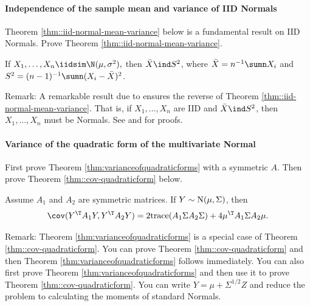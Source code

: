 \paragraph{Independence of the sample mean and variance of IID Normals}\label{hw00math2::independence-mean-variance}


Theorem \ref{thm::iid-normal-mean-variance} below is a fundamental result on IID Normals. Prove Theorem \ref{thm::iid-normal-mean-variance}. 

\begin{theorem}
\label{thm::iid-normal-mean-variance}
If $X_{1},\ldots,X_{n} \iidsim \N(\mu,\sigma^{2}),$ then $\bar{X}\ind S^{2}$,
where $\bar{X}=n^{-1}\sumn X_{i}$ and $S^{2}=(n-1)^{-1}\sumn(X_{i}-\bar{X})^{2}$.
\end{theorem}



Remark: A remarkable result due to \citet{geary1936distribution} ensures the reverse of Theorem \ref{thm::iid-normal-mean-variance}. That is, if $X_{1},\ldots,X_{n} $ are IID and $\bar{X}\ind S^{2}$, then $X_{1},\ldots,X_{n} $ must be Normals. See \citet{lukacs1942characterization} and \citet{benhamou2018three} for proofs. 



\paragraph{Variance of the quadratic form of the multivariate Normal}\label{hw00math2::variance-quadratic}

First prove Theorem \ref{thm:varianceofquadraticforms} with a symmetric $A$. 
Then prove Theorem \ref{thm::cov-quadraticform} below. 

\begin{theorem}
\label{thm::cov-quadraticform}
Assume $A_1$ and $A_2$ are symmetric matrices. If $Y\sim\textup{N}(\mu,\Sigma)$, then
$$
\cov(  Y^{\T}A_1Y, Y^{\T}A_2Y)
= 2\textup{trace}(A_1\Sigma A_2\Sigma)+4\mu^{\T}A_1\Sigma A_2\mu . 
$$
\end{theorem}
 


Remark: 
Theorem \ref{thm:varianceofquadraticforms} is a special case of Theorem \ref{thm::cov-quadraticform}. You can prove Theorem \ref{thm::cov-quadraticform} and then Theorem \ref{thm:varianceofquadraticforms} follows immediately. You can also first prove Theorem \ref{thm:varianceofquadraticforms} and then use it to prove Theorem \ref{thm::cov-quadraticform}. You can write $Y = \mu + \Sigma^{1/2} Z$ and reduce the problem to calculating the moments of standard Normals. 





 

